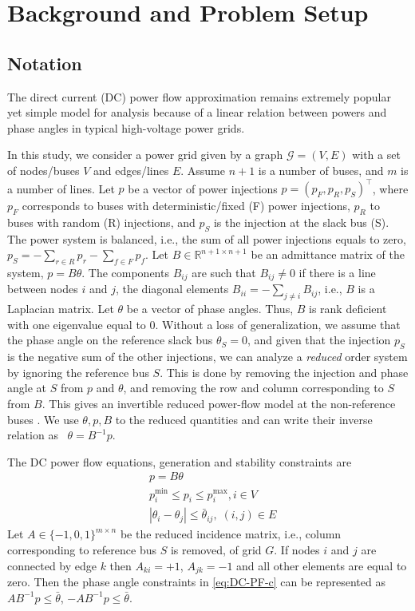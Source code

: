 \section{Background and Problem Setup}\label{sec:not}

\subsection{Notation}
The direct current (DC) power flow approximation remains extremely popular yet simple model for analysis because of a linear relation between powers and phase angles in typical high-voltage power grids. 

In this study, we consider a power grid given by a graph $\mathcal{G} = (V, E)$ with a set of nodes/buses $V$ and edges/lines $E$. Assume $n+1$ is a number of buses, and $m$ is a number of lines. Let $p$ be a vector of power injections $p = (p_F, p_R, p_S)^\top$, where $p_F$ corresponds to buses with deterministic/fixed (F) power injections, $p_R$ to buses with random (R) injections, and $p_S$ is the injection at the slack bus (S). The power system is balanced, i.e., the sum of all power injections equals to zero, $p_S = -\sum_{r\in R} p_r - \sum_{f\in F} p_f$. Let $B \in \mathbb{R}^{n+1 \times n+1}$ be an admittance matrix of the system, $p = B\theta$. The components $B_{ij}$ are such that $B_{ij} \neq 0$ if there is a line between nodes $i$ and $j$, the diagonal elements $B_{ii} = - \sum_{j\neq i} B_{ij}$, i.e., $B$ is a Laplacian matrix. Let $\theta$ be a vector of phase angles. Thus, $B$ is rank deficient with one eigenvalue equal to $0$. Without a loss of generalization, we assume that the phase angle on the reference slack bus $\theta_S = 0$, and given that the injection $p_S$ is the negative sum of the other injections, we can analyze a \textit{reduced} order system by ignoring the reference bus $S$. This is done by removing the injection and phase angle at $S$ from $p$ and $\theta$, and removing the row and column corresponding to $S$ from $B$. This gives an invertible reduced power-flow model at the non-reference buses \cite{aburbook,dekatcns}. We use $\theta, p, B$ to the reduced quantities and can write their inverse relation as ~$\theta = B^{-1} p$.

The DC power flow equations, generation and stability constraints are
\begin{align}
    & p = B \theta \label{eq:DC-PF-a}\\
    & p^{\min}_i \leq p_i \leq p^{\max}_i, i \in V \label{eq:DC-PF-b}\\
    & |\theta_i - \theta_j| \leq \bar{\theta}_{ij}, \; (i,j)\in E \label{eq:DC-PF-c}
\end{align}
Let $A \in \{-1,0,1 \}^{m \times n}$ be the reduced incidence matrix, i.e., column corresponding to reference bus $S$ is removed, of grid $G$. If nodes $i$ and $j$ are connected by edge $k$ then $A_{ki} = +1$, $A_{jk} = -1$ and all other elements are equal to zero. Then the phase angle constraints in \eqref{eq:DC-PF-c} can be represented as  $AB^{-1}p \le \bar\theta$, $-AB^{-1}p \le \bar\theta$. 

